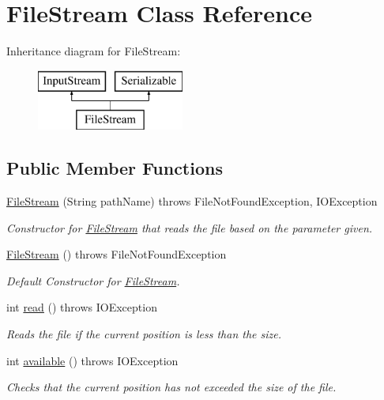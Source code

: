 \hypertarget{class_file_stream}{}\section{File\+Stream Class Reference}
\label{class_file_stream}
Inheritance diagram for File\+Stream\+:\begin{figure}[H]
\begin{center}
\leavevmode
\includegraphics[height=2.000000cm]{class_file_stream}
\end{center}
\end{figure}
\subsection*{Public Member Functions}
\begin{DoxyCompactItemize}
\item 
\hyperlink{class_file_stream_a120b1fd6e4c74e93199d063da1c65b98}{File\+Stream} (String path\+Name)  throws File\+Not\+Found\+Exception, I\+O\+Exception    
\begin{DoxyCompactList}\small\item\em Constructor for \hyperlink{class_file_stream}{File\+Stream} that reads the file based on the parameter given. \end{DoxyCompactList}\item 
\hyperlink{class_file_stream_aa919eed4082491d09520911563d44efd}{File\+Stream} ()  throws File\+Not\+Found\+Exception    
\begin{DoxyCompactList}\small\item\em Default Constructor for \hyperlink{class_file_stream}{File\+Stream}. \end{DoxyCompactList}\item 
int \hyperlink{class_file_stream_a7f2ea40eff2241931a4ca971364cd532}{read} ()  throws I\+O\+Exception     
\begin{DoxyCompactList}\small\item\em Reads the file if the current position is less than the size. \end{DoxyCompactList}\item 
int \hyperlink{class_file_stream_a7dd240b96afa9e37f9a6bd8e4b99e48b}{available} ()  throws I\+O\+Exception     
\begin{DoxyCompactList}\small\item\em Checks that the current position has not exceeded the size of the file. \end{DoxyCompactList}\end{DoxyCompactItemize}
